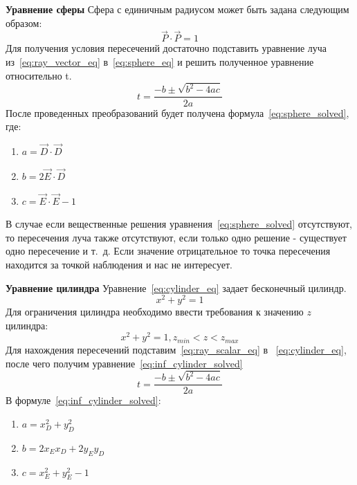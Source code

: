 \documentclass[a4paper,14pt,unknownkeysallowed]{extreport}
\begin{document}
\textbf{Уравнение сферы}
Сфера с единичным радиусом может быть задана следующим образом:
\begin{equation}
	\vec{P} \cdot \vec{P}=1
	\label{eq:sphere_eq}
\end{equation}
Для получения условия пересечений достаточно подставить уравнение луча из~\ref{eq:ray_vector_eq} в~\ref{eq:sphere_eq} и решить полученное уравнение относительно t.
\begin{equation}
	t=\frac{-b\pm\sqrt{b^2-4ac}}{2a}
	\label{eq:sphere_solved}
\end{equation}
После проведенных преобразований будет получена формула~\ref{eq:sphere_solved}, где:
\begin{enumerate}
	\item $a = \vec{D} \cdot \vec{D}$ 
	\item $b = 2\vec{E} \cdot \vec{D}$ 
	\item $c = \vec{E} \cdot \vec{E} - 1$
\end{enumerate}
В случае если вещественные решения уравнения~\ref{eq:sphere_solved} отсутствуют, то пересечения луча также отсутствуют, если только одно решение  - существует одно
пересечение и т.~д. Если значение отрицательное то точка пересечения находится за точкой наблюдения и нас не интересует.\cite{primitives_raytracing_equations}

\textbf{Уравнение цилиндра}
Уравнение~\ref{eq:cylinder_eq} задает бесконечный цилиндр.
\begin{equation}
	x^2 + y^2=1
	\label{eq:cylinder_eq}
\end{equation}
Для ограничения цилиндра необходимо ввести требования к значению $z$ цилиндра:
\begin{equation}
	x^2 + y^2=1,z_{min} < z  < z_{max}	
	\label{eq:cylinder_eq_demanding}
\end{equation}
Для нахождения пересечений подставим~\ref{eq:ray_scalar_eq} в ~\ref{eq:cylinder_eq}, после чего получим уравнение~\ref{eq:inf_cylinder_solved}
\begin{equation}
	t=\frac{-b\pm\sqrt{b^2-4ac}}{2a}
	\label{eq:inf_cylinder_solved}
\end{equation}
В формуле~\ref{eq:inf_cylinder_solved}:
\begin{enumerate}
	\item $a = x_{D}^2 + y_{D}^2$ 
	\item $b = 2x_Ex_D+2y_Ey_D$ 
	\item $c = x_{E}^2+y_{E}^2 - 1$
\end{enumerate}
\end{document}
